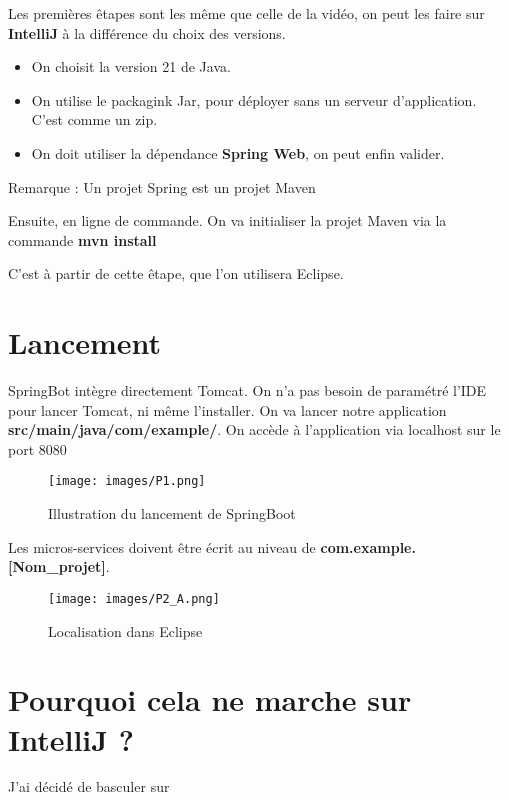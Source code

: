 \documentclass{rapport}
\begin{document}
Les premières êtapes sont les même que celle de la vidéo, on peut les faire sur \textbf{IntelliJ} à la différence du choix des versions.

\begin{itemize}
	\item On choisit la version 21 de Java.
	\item On utilise le packagink Jar, pour déployer sans un serveur d'application. C'est comme un zip. 
	\item On doit utiliser la dépendance \textbf{Spring Web}, on peut enfin valider.
\end{itemize}
Remarque :  Un projet Spring est un projet Maven\newline

Ensuite, en ligne de commande. On va initialiser la projet Maven via la commande \textbf{mvn install} 

C'est à partir de cette êtape, que l'on utilisera Eclipse. 


\section{Lancement}

SpringBot intègre directement Tomcat. On n'a pas besoin de paramétré l'IDE pour lancer Tomcat, ni même l'installer. On va lancer notre application \textbf{src/main/java/com/example/}. On accède à l'application via localhost sur le port 8080

\begin{figure}[H]
	\centering
    \texttt{[image: images/P1.png]}
    \caption{Illustration du lancement de SpringBoot}
\end{figure}

Les micros-services doivent être écrit au niveau de \textbf{com.example.[Nom_projet]}. 

\begin{figure}[H]
	\centering
    \texttt{[image: images/P2\_A.png]}
    \caption{Localisation dans Eclipse}
\end{figure}




\section{Pourquoi cela ne marche sur IntelliJ ?}

J'ai décidé de basculer sur 
\end{document}

